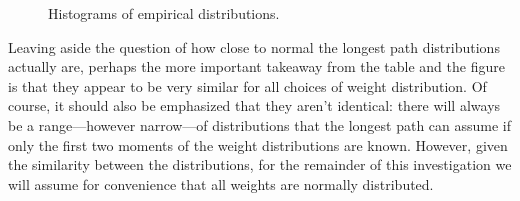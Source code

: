 \documentclass[12pt]{article}
\begin{document}
      \begin{figure}
	\centering	
	\caption{Histograms of empirical distributions.}	
	\label{plot.emp_hists} 
      \end{figure}

Leaving aside the question of how close to normal the longest path distributions actually are, perhaps the more important takeaway from the table and the figure is that they appear to be very similar for all choices of weight distribution. Of course, it should also be emphasized that they aren't identical: there will always be a range---however narrow---of distributions that the longest path can assume if only the first two moments of the weight distributions are known. However, given the similarity between the distributions, for the remainder of this investigation we will assume for convenience that all weights are normally distributed. 
\end{document}
